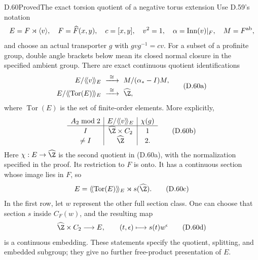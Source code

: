 \begin{claim}{D.60}{Proved}{The exact torsion quotient of a negative torus extension}
Use D.59's notation
\[
 E=F\rtimes\langle v\rangle,\quad F=\widehat F(x,y),
 \quad c=[x,y],\quad v^2=1,\quad
 \alpha=\operatorname{Inn}(v)|_F,\quad M=F^{\rm ab},
\]
and choose an actual transporter $g$ with
$gvg^{-1}=cv$.
For a subset of a profinite group, double angle
brackets below mean its closed normal closure in
the specified ambient group. There are exact
continuous quotient identifications
\[
 \begin{split}
 E/\langle\!\langle v\rangle\!\rangle_E
 &\ \xrightarrow{\ \cong\ }\ M/(\alpha_*-I)M,\\
 E/\langle\!\langle\operatorname{Tor}(E)\rangle\!\rangle_E
 &\ \xrightarrow{\ \cong\ }\ \widehat\Z ,
 \end{split}                                             \tag{D.60a}
\]
where $\operatorname{Tor}(E)$ is the set of
finite-order elements. More explicitly,
\[
\begin{array}{c|c|c}
 A_2\bmod2&
 E/\langle\!\langle v\rangle\!\rangle_E&
 \chi(g)\\ \hline
 I&\widehat\Z\times C_2&1\\
 \ne I&\widehat\Z&2 .
\end{array}                                              \tag{D.60b}
\]
Here $\chi:E\to\widehat\Z$ is the second quotient
in (D.60a), with the normalization specified in
the proof. Its restriction to $F$ is onto.
It has a continuous section whose image lies
in $F$, so
\[
 E=\langle\!\langle\operatorname{Tor}(E)\rangle\!\rangle_E
                         \rtimes s(\widehat\Z).          \tag{D.60c}
\]
In the first row, let $w$ represent the other
full section class. One can choose that section
$s$ inside $C_F(w)$, and the resulting map
\[
 \widehat\Z\times C_2\longrightarrow E,\qquad
            (t,\epsilon)\longmapsto s(t)w^\epsilon       \tag{D.60d}
\]
is a continuous embedding. These statements specify
the quotient, splitting, and embedded subgroup;
they give no further free-product presentation
of $E$.
\end{claim}

